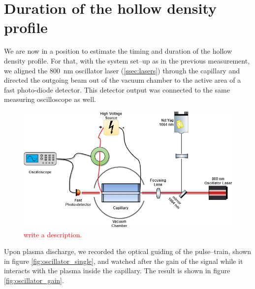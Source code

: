 \documentclass[justified,nofonts,nobib,openany]{tufte-book}
\begin{document}
\section{Duration of the hollow density profile}\label{sec:duration-of-guiding}
We are now in a position to estimate the timing and duration of the hollow density profile. For that, with the system set--up as in the previous measurement, we aligned the \SI{800}{\nm} oscillator laser (\ref{ssec:lasers}) through the capillary and directed the outgoing beam out of the vacuum chamber to the active area of a fast photo-diode detector. This detector output was connected to the same measuring oscilloscope as well.

\begin{figure}
\centering \includegraphics[width=\textwidth]{figures/oscillator.png}
\caption{\textcolor{red}{write a description.}}
\label{fig:oscillator}
\end{figure}
Upon plasma discharge, we recorded the optical guiding of the pulse--train, shown in figure  \ref{fig:oscillator_single}, and watched after the gain of the signal while it interacts with the plasma inside the capillary. The result is shown in figure \ref{fig:oscillator_gain}.
\end{document}
